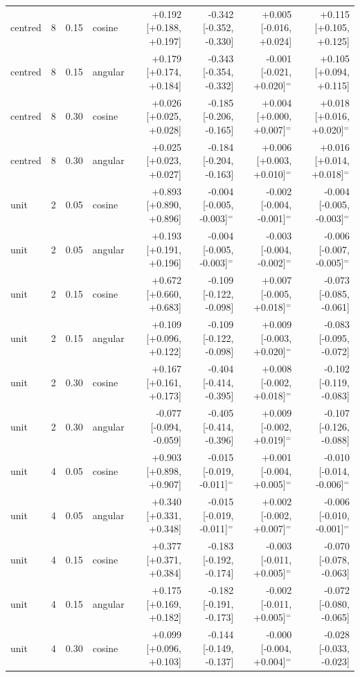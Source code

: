 \begin{tabular}{lrrlrrrr}
centred & 8 & 0.15 & cosine & +0.192 [+0.188, +0.197] & -0.342 [-0.352, -0.330] & +0.005 [-0.016, +0.024] & +0.115 [+0.105, +0.125] \\
centred & 8 & 0.15 & angular & +0.179 [+0.174, +0.184] & -0.343 [-0.354, -0.332] & -0.001 [-0.021, +0.020]$^{=}$ & +0.105 [+0.094, +0.115] \\
centred & 8 & 0.30 & cosine & +0.026 [+0.025, +0.028] & -0.185 [-0.206, -0.165] & +0.004 [+0.000, +0.007]$^{=}$ & +0.018 [+0.016, +0.020]$^{=}$ \\
centred & 8 & 0.30 & angular & +0.025 [+0.023, +0.027] & -0.184 [-0.204, -0.163] & +0.006 [+0.003, +0.010]$^{=}$ & +0.016 [+0.014, +0.018]$^{=}$ \\
unit & 2 & 0.05 & cosine & +0.893 [+0.890, +0.896] & -0.004 [-0.005, -0.003]$^{=}$ & -0.002 [-0.004, -0.001]$^{=}$ & -0.004 [-0.005, -0.003]$^{=}$ \\
unit & 2 & 0.05 & angular & +0.193 [+0.191, +0.196] & -0.004 [-0.005, -0.003]$^{=}$ & -0.003 [-0.004, -0.002]$^{=}$ & -0.006 [-0.007, -0.005]$^{=}$ \\
unit & 2 & 0.15 & cosine & +0.672 [+0.660, +0.683] & -0.109 [-0.122, -0.098] & +0.007 [-0.005, +0.018]$^{=}$ & -0.073 [-0.085, -0.061] \\
unit & 2 & 0.15 & angular & +0.109 [+0.096, +0.122] & -0.109 [-0.122, -0.098] & +0.009 [-0.003, +0.020]$^{=}$ & -0.083 [-0.095, -0.072] \\
unit & 2 & 0.30 & cosine & +0.167 [+0.161, +0.173] & -0.404 [-0.414, -0.395] & +0.008 [-0.002, +0.018]$^{=}$ & -0.102 [-0.119, -0.083] \\
unit & 2 & 0.30 & angular & -0.077 [-0.094, -0.059] & -0.405 [-0.414, -0.396] & +0.009 [-0.002, +0.019]$^{=}$ & -0.107 [-0.126, -0.088] \\
unit & 4 & 0.05 & cosine & +0.903 [+0.898, +0.907] & -0.015 [-0.019, -0.011]$^{=}$ & +0.001 [-0.004, +0.005]$^{=}$ & -0.010 [-0.014, -0.006]$^{=}$ \\
unit & 4 & 0.05 & angular & +0.340 [+0.331, +0.348] & -0.015 [-0.019, -0.011]$^{=}$ & +0.002 [-0.002, +0.007]$^{=}$ & -0.006 [-0.010, -0.001]$^{=}$ \\
unit & 4 & 0.15 & cosine & +0.377 [+0.371, +0.384] & -0.183 [-0.192, -0.174] & -0.003 [-0.011, +0.005]$^{=}$ & -0.070 [-0.078, -0.063] \\
unit & 4 & 0.15 & angular & +0.175 [+0.169, +0.182] & -0.182 [-0.191, -0.173] & -0.002 [-0.011, +0.005]$^{=}$ & -0.072 [-0.080, -0.065] \\
unit & 4 & 0.30 & cosine & +0.099 [+0.096, +0.103] & -0.144 [-0.149, -0.137] & -0.000 [-0.004, +0.004]$^{=}$ & -0.028 [-0.033, -0.023] \\

\end{tabular}
